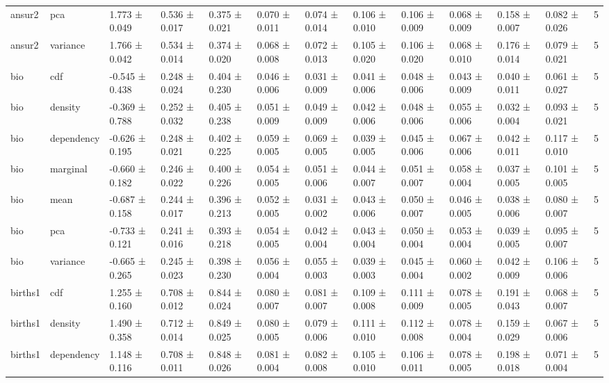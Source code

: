 \begin{table}
\begin{tabular}{llllllllllllr}
ansur2 & pca & 1.773 ± 0.049 & 0.536 ± 0.017 & 0.375 ± 0.021 & 0.070 ± 0.011 & 0.074 ± 0.014 & 0.106 ± 0.010 & 0.106 ± 0.009 & 0.068 ± 0.009 & 0.158 ± 0.007 & 0.082 ± 0.026 & 5 \\
ansur2 & variance & 1.766 ± 0.042 & 0.534 ± 0.014 & 0.374 ± 0.020 & 0.068 ± 0.008 & 0.072 ± 0.013 & 0.105 ± 0.020 & 0.106 ± 0.020 & 0.068 ± 0.010 & 0.176 ± 0.014 & 0.079 ± 0.021 & 5 \\
bio & cdf & -0.545 ± 0.438 & 0.248 ± 0.024 & 0.404 ± 0.230 & 0.046 ± 0.006 & 0.031 ± 0.009 & 0.041 ± 0.006 & 0.048 ± 0.006 & 0.043 ± 0.009 & 0.040 ± 0.011 & 0.061 ± 0.027 & 5 \\
bio & density & -0.369 ± 0.788 & 0.252 ± 0.032 & 0.405 ± 0.238 & 0.051 ± 0.009 & 0.049 ± 0.009 & 0.042 ± 0.006 & 0.048 ± 0.006 & 0.055 ± 0.006 & 0.032 ± 0.004 & 0.093 ± 0.021 & 5 \\
bio & dependency & -0.626 ± 0.195 & 0.248 ± 0.021 & 0.402 ± 0.225 & 0.059 ± 0.005 & 0.069 ± 0.005 & 0.039 ± 0.005 & 0.045 ± 0.006 & 0.067 ± 0.006 & 0.042 ± 0.011 & 0.117 ± 0.010 & 5 \\
bio & marginal & -0.660 ± 0.182 & 0.246 ± 0.022 & 0.400 ± 0.226 & 0.054 ± 0.005 & 0.051 ± 0.006 & 0.044 ± 0.007 & 0.051 ± 0.007 & 0.058 ± 0.004 & 0.037 ± 0.005 & 0.101 ± 0.005 & 5 \\
bio & mean & -0.687 ± 0.158 & 0.244 ± 0.017 & 0.396 ± 0.213 & 0.052 ± 0.005 & 0.031 ± 0.002 & 0.043 ± 0.006 & 0.050 ± 0.007 & 0.046 ± 0.005 & 0.038 ± 0.006 & 0.080 ± 0.007 & 5 \\
bio & pca & -0.733 ± 0.121 & 0.241 ± 0.016 & 0.393 ± 0.218 & 0.054 ± 0.005 & 0.042 ± 0.004 & 0.043 ± 0.004 & 0.050 ± 0.004 & 0.053 ± 0.004 & 0.039 ± 0.005 & 0.095 ± 0.007 & 5 \\
bio & variance & -0.665 ± 0.265 & 0.245 ± 0.023 & 0.398 ± 0.230 & 0.056 ± 0.004 & 0.055 ± 0.003 & 0.039 ± 0.003 & 0.045 ± 0.004 & 0.060 ± 0.002 & 0.042 ± 0.009 & 0.106 ± 0.006 & 5 \\
births1 & cdf & 1.255 ± 0.160 & 0.708 ± 0.012 & 0.844 ± 0.024 & 0.080 ± 0.007 & 0.081 ± 0.007 & 0.109 ± 0.008 & 0.111 ± 0.009 & 0.078 ± 0.005 & 0.191 ± 0.043 & 0.068 ± 0.007 & 5 \\
births1 & density & 1.490 ± 0.358 & 0.712 ± 0.014 & 0.849 ± 0.025 & 0.080 ± 0.005 & 0.079 ± 0.006 & 0.111 ± 0.010 & 0.112 ± 0.008 & 0.078 ± 0.004 & 0.159 ± 0.029 & 0.067 ± 0.006 & 5 \\
births1 & dependency & 1.148 ± 0.116 & 0.708 ± 0.011 & 0.848 ± 0.026 & 0.081 ± 0.004 & 0.082 ± 0.008 & 0.105 ± 0.010 & 0.106 ± 0.011 & 0.078 ± 0.005 & 0.198 ± 0.018 & 0.071 ± 0.004 & 5 \\

\end{tabular}
\end{table}
